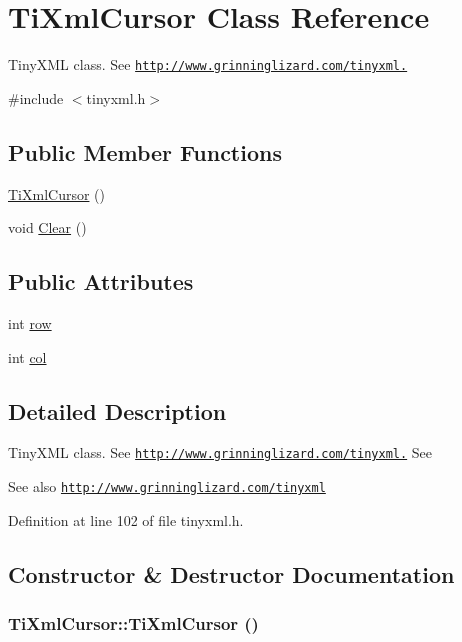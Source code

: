 \hypertarget{struct_ti_xml_cursor}{
\section{TiXmlCursor Class Reference}
\label{struct_ti_xml_cursor}
}


TinyXML class. See \href{http://www.grinninglizard.com/tinyxml.}{\tt http://www.grinninglizard.com/tinyxml.}  


{\ttfamily \#include $<$tinyxml.h$>$}\subsection*{Public Member Functions}
\begin{DoxyCompactItemize}
\item 
\hyperlink{struct_ti_xml_cursor_a7ad233928a675f0271eb440b150e3ff1}{TiXmlCursor} ()
\item 
void \hyperlink{struct_ti_xml_cursor_a1e6fa622b59dafb71b6efe595105dcdd}{Clear} ()
\end{DoxyCompactItemize}
\subsection*{Public Attributes}
\begin{DoxyCompactItemize}
\item 
int \hyperlink{struct_ti_xml_cursor_a5b54dd949820c2db061e2be41f3effb3}{row}
\item 
int \hyperlink{struct_ti_xml_cursor_a5694d7ed2c4d20109d350c14c417969d}{col}
\end{DoxyCompactItemize}


\subsection{Detailed Description}
TinyXML class. See \href{http://www.grinninglizard.com/tinyxml.}{\tt http://www.grinninglizard.com/tinyxml.} See \begin{DoxySeeAlso}{See also}
\href{http://www.grinninglizard.com/tinyxml}{\tt http://www.grinninglizard.com/tinyxml} 
\end{DoxySeeAlso}


Definition at line 102 of file tinyxml.h.

\subsection{Constructor \& Destructor Documentation}
\hypertarget{struct_ti_xml_cursor_a7ad233928a675f0271eb440b150e3ff1}{
\subsubsection[{TiXmlCursor}]{\setlength{\rightskip}{0pt plus 5cm}TiXmlCursor::TiXmlCursor ()}}
\label{struct_ti_xml_cursor_a7ad233928a675f0271eb440b150e3ff1}


